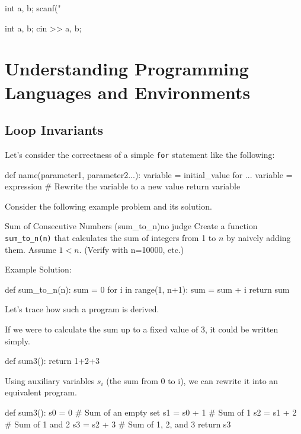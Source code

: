 \begin{purecbox}
int a, b;
scanf("
\end{purecbox}
\begin{cbox}
int a, b;
cin >> a, b;
\end{cbox}


\chapter{Understanding Programming Languages and Environments}
\section{Loop Invariants}\label{chapter:loop-invariants}

Let's consider the correctness of a simple \texttt{for} statement like the following:

\begin{terminal}[emph={}]
def name(parameter1, parameter2...):
    variable = initial_value
    for ...
      variable = expression # Rewrite the variable to a new value
    return variable
\end{terminal}

Consider the following example problem and its solution.

\begin{psbox}{Sum of Consecutive Numbers (sum\_to\_n)}{no judge}
  Create a function \texttt{sum\_to\_n(n)} that calculates the sum of integers from 1 to $n$ by naively adding them. Assume $1<n$.
  (Verify with n=10000, etc.)
\end{psbox}

Example Solution:
\begin{pybox}
def sum_to_n(n):
    sum = 0
    for i in range(1, n+1):
        sum = sum + i
    return sum
\end{pybox}
Let's trace how such a program is derived.

If we were to calculate the sum up to a fixed value of 3, it could be written simply.
\begin{pybox}
def sum3():
    return 1+2+3
\end{pybox}
Using auxiliary variables $s_i$ (the sum from 0 to i), we can rewrite it into an equivalent program.
\begin{pybox}
def sum3():
    s0 = 0 # Sum of an empty set
    s1 = s0 + 1 # Sum of 1
    s2 = s1 + 2 # Sum of 1 and 2
    s3 = s2 + 3 # Sum of 1, 2, and 3
    return s3
\end{pybox}

